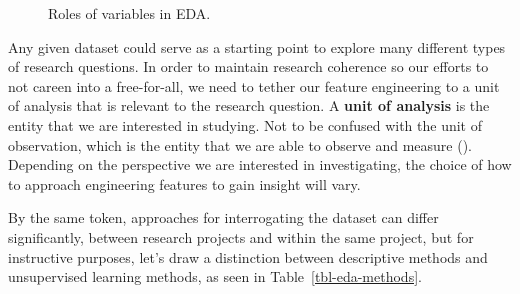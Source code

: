 \documentclass[
  letterpaper,
]{latex/krantz}
\theoremstyle{definition}
\theoremstyle{remark}
\begin{document}
\begin{figure}[H]


\caption{\label{fig-eda-variables}Roles of variables in EDA.}

\end{figure}%

Any given dataset could serve as a starting point to explore many
different types of research questions. In order to maintain research
coherence so our efforts to not careen into a free-for-all, we need to
tether our feature engineering to a unit of analysis that is relevant to
the research question. A \textbf{unit of analysis} is the entity that we
are interested in studying. Not to be confused with the unit of
observation, which is the entity that we are able to observe and measure
(). Depending on the
perspective we are interested in investigating, the choice of how to
approach engineering features to gain insight will vary.

By the same token, approaches for interrogating the dataset can differ
significantly, between research projects and within the same project,
but for instructive purposes, let's draw a distinction between
descriptive methods and unsupervised learning methods, as seen in
Table~\ref{tbl-eda-methods}.
\end{document}
